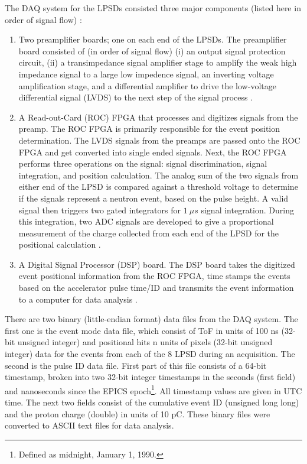 The DAQ system for the LPSDs consisted three major components (listed here in order of signal flow) \cite{Beal2021}:
\begin{enumerate}
    \item Two preamplifier boards; one on each end of the LPSDs. The preamplifier board consisted of (in order of signal flow) (i) an output signal protection circuit, (ii) a transimpedance signal amplifier stage to amplify the weak high impedance signal to a large low impedence signal, an inverting voltage amplification stage, and a differential amplifier to drive the low-voltage differential signal (LVDS) to the next step of the signal process \cite{Beal2021, Riedel2012}.
    \item A Read-out-Card (ROC) FPGA that processes and digitizes signals from the preamp. The ROC FPGA is primarily responsible for the event position determination. The LVDS signals from the preamps are passed onto the ROC FPGA and get converted into single ended signals. Next, the ROC FPGA performs three operations on the signal: signal discrimination, signal integration, and position calculation. The analog sum of the two signals from either end of the LPSD is compared against a threshold voltage to determine if the signals represent a neutron event, based on the pulse height. A valid signal then triggers two gated integrators for $1~\mu s$ signal integration. During this integration, two ADC signals are developed to give a proportional measurement of the charge collected from each end of the LPSD for the positional calculation \cite{Beal2021}.
    \item A Digital Signal Processor (DSP) board. The DSP board takes the digitized event positional information from the ROC FPGA, time stamps the events based on the accelerator pulse time/ID and transmits the event information to a computer for data analysis \cite{Beal2021}.
\end{enumerate} 

There are two binary (little-endian format) data files from the DAQ system. The first one is the event mode data file, which consist of ToF in units of 100 ns (32-bit unsigned integer) and positional hits n units of pixels (32-bit unsigned integer) data for the events from each of the 8 LPSD during an acquisition. The second is the pulse ID data file. First part of this file consists of a 64-bit timestamp, broken into two 32-bit integer timestamps in the seconds (first field) and nanoseconds since the EPICS epoch\footnote{Defined as midnight, January 1, 1990.}. All timestamp values are given in UTC time. The next two fields consist of the cumulative event ID (unsigned long long) and the proton charge (double) in units of 10 pC. These binary files were converted to ASCII text files for data analysis.

